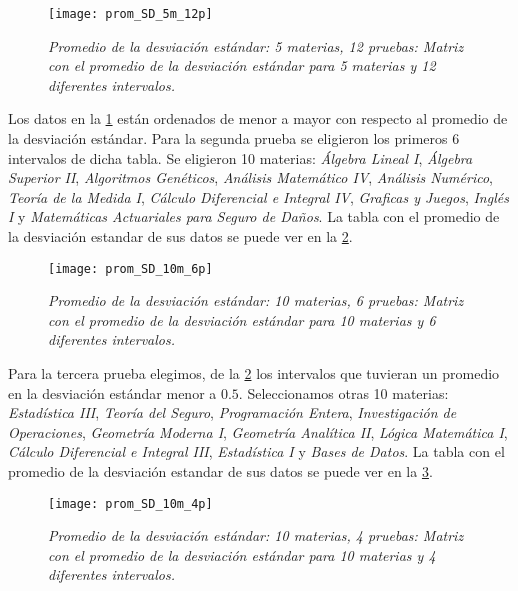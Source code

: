 \begin{figure}[H]
\centering
\texttt{[image: prom\_SD\_5m\_12p]} %
\caption[\textit{Promedio de la desviación estándar: 5 materias, 12 pruebas}]{\textit{Promedio de la desviación estándar: 5 materias, 12 pruebas: Matriz con el promedio de la desviación estándar para 5 materias y 12 diferentes intervalos.}}\label{promSD_5m_12p}
\end{figure}


Los datos en la \figurename{\ref{promSD_5m_12p}} están ordenados de menor a mayor con respecto al promedio de la desviación estándar. Para la segunda prueba se eligieron los primeros 6 intervalos de dicha tabla. Se eligieron 10 materias: \textit{Álgebra Lineal I}, \textit{Álgebra Superior II}, \textit{Algoritmos Genéticos}, \textit{Análisis Matemático IV}, \textit{Análisis Numérico}, \textit{Teoría de la Medida I}, \textit{Cálculo Diferencial e Integral IV}, \textit{Graficas y Juegos}, \textit{Inglés I} y \textit{Matemáticas Actuariales para Seguro de Daños}. La tabla con el promedio de la desviación estandar de sus datos se puede ver en la \figurename{\ref{promSD_10m_6p}}.


\begin{figure}[H]
\centering
\texttt{[image: prom\_SD\_10m\_6p]} %
\caption[\textit{Promedio de la desviación estándar: 10 materias, 6 pruebas}]{\textit{Promedio de la desviación estándar: 10 materias, 6 pruebas: Matriz con el promedio de la desviación estándar para 10 materias y 6 diferentes intervalos.}}\label{promSD_10m_6p}
\end{figure}


Para la tercera prueba elegimos, de la \figurename{\ref{promSD_10m_6p}} los intervalos que tuvieran un promedio en la desviación estándar menor a $0.5$. Seleccionamos otras 10 materias: \textit{Estadística III}, \textit{Teoría del Seguro}, \textit{Programación Entera}, \textit{Investigación de Operaciones}, \textit{Geometría Moderna I}, \textit{Geometría Analítica II}, \textit{Lógica Matemática I}, \textit{Cálculo Diferencial e Integral III}, \textit{Estadística I} y \textit{Bases de Datos}. La tabla con el promedio de la desviación estandar de sus datos se puede ver en la \figurename{\ref{promSD_10m_4p}}.


\begin{figure}[H]
\centering
\texttt{[image: prom\_SD\_10m\_4p]} %
\caption[\textit{Promedio de la desviación estándar: 10 materias, 4 pruebas}]{\textit{Promedio de la desviación estándar: 10 materias, 4 pruebas: Matriz con el promedio de la desviación estándar para 10 materias y 4 diferentes intervalos.}}\label{promSD_10m_4p}
\end{figure}

